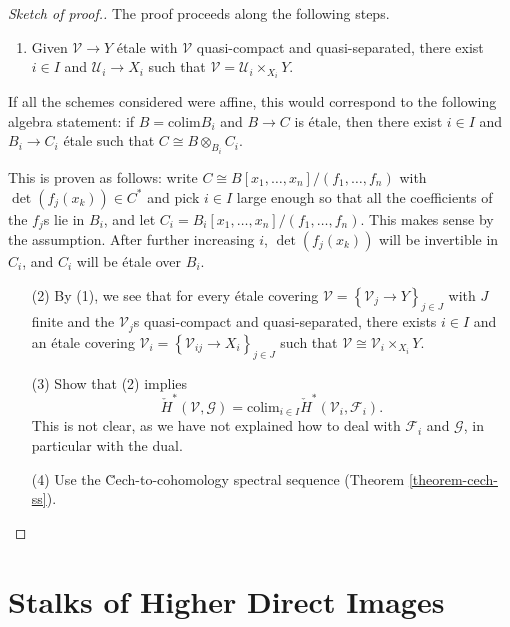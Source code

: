 \begin{proof}[Sketch of proof.]
The proof proceeds along the following steps.
\begin{enumerate}
\item Given $\mathcal{V}\to Y$ \'etale with $\mathcal{V}$ quasi-compact and
quasi-separated, there exist $i\in I$ and $\mathcal{U}_i \to X_i$ such that
$\mathcal{V} = \mathcal{U}_i \times_{X_i} Y$.
\end{enumerate}
If all the schemes considered were affine, this would correspond to the
following algebra statement: if $B=\text{colim} B_i$ and $B\to C$ is \'etale,
then there exist $i\in I$ and $B_i\to C_i$ \'etale such that $C \cong B
\otimes_{B_i} C_i$.

\medskip\noindent
This is proven as follows: write $C \cong B\left[x_1,\ldots, x_n\right]/(f_1,
\ldots, f_n)$ with $\det (f_j(x_k)) \in C^*$ and pick $i\in I$ large enough so
that all the coefficients of the $f_j$s lie in $B_i$, and let $C_i =
B_i\left[x_1, \ldots, x_n\right]/(f_1, \dots, f_n)$. This makes sense by the
assumption. After further increasing $i$, $\det (f_j(x_k))$ will be invertible
in $C_i$, and $C_i$ will be \'etale over $B_i$.
\begin{enumerate}
\item[(2)]
By (1), we see that for every \'etale covering $\mathcal{V} =
\left\{\mathcal{V}_j\to Y\right\}_{j\in J}$ with $J$ finite and the
$\mathcal{V}_j$s quasi-compact and quasi-separated, there exists $i\in I$ and
an \'etale covering $\mathcal{V}_i = \left\{\mathcal{V}_{ij} \to X_i
\right\}_{j\in J}$ such that $\mathcal{V} \cong \mathcal{V}_i\times_{X_i} Y$.
\item[(3)]
Show that (2) implies
$$
\check H^*(\mathcal{V}, \mathcal{G})=\text{colim}_{i\in I}\check
H^*(\mathcal{V}_i, \mathcal{F}_i).
$$
This is not clear, as we have not explained how to deal with $\mathcal{F}_i$
and $\mathcal{G}$, in particular with the dual.
\item[(4)] Use the \u Cech-to-cohomology spectral sequence
(Theorem \ref{theorem-cech-ss}).
\end{enumerate}
\end{proof}





\section{Stalks of Higher Direct Images}
\label{section-stalks-direct-image}

